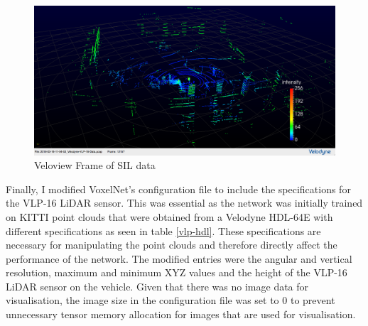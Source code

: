 \begin{figure}[h]
	\centering
	\includegraphics[width=\linewidth]{images/sil.png}
	\caption{Veloview Frame of SIL data}
	\label{fig:sil}
\end{figure}


Finally, I modified VoxelNet's configuration file to include the specifications for the VLP-16 LiDAR sensor. This was essential as the network was initially trained on KITTI point clouds that were obtained from a Velodyne HDL-64E with different specifications as seen in table \ref{vlp-hdl}. These specifications are necessary for manipulating the point clouds and therefore directly affect the performance of the network. The modified entries were the angular and vertical resolution, maximum and minimum XYZ values and the height of the VLP-16 LiDAR sensor on the vehicle. Given that there was no image data for visualisation, the image size in the configuration file was set to 0 to prevent unnecessary tensor memory allocation for images that are used for visualisation. 

\begin{table}[H]
	\centering
	
	\caption{Velodyne HDL-64E and VLP-16 Specifications.}
	\label{vlp-hdl}
\end{table}



